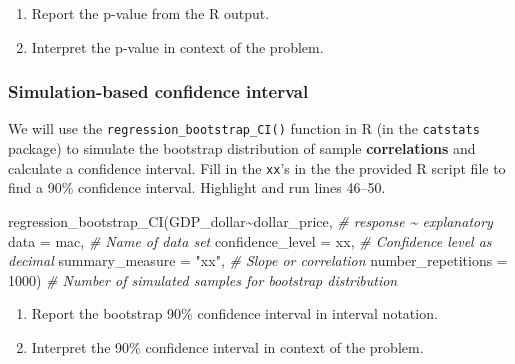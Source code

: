 \documentclass[
]{report}
\newenvironment{Shaded}{\begin{snugshade}}{\end{snugshade}}
\newcommand{\AttributeTok}[1]{\textcolor[rgb]{0.77,0.63,0.00}{#1}}
\newcommand{\CommentTok}[1]{\textcolor[rgb]{0.56,0.35,0.01}{\textit{#1}}}
\newcommand{\DecValTok}[1]{\textcolor[rgb]{0.00,0.00,0.81}{#1}}
\newcommand{\FunctionTok}[1]{\textcolor[rgb]{0.00,0.00,0.00}{#1}}
\newcommand{\NormalTok}[1]{#1}
\newcommand{\SpecialCharTok}[1]{\textcolor[rgb]{0.00,0.00,0.00}{#1}}
\newcommand{\StringTok}[1]{\textcolor[rgb]{0.31,0.60,0.02}{#1}}
\begin{document}
\begin{enumerate}
\def\labelenumi{\arabic{enumi}.}
\setcounter{enumi}{7}
\item
  Report the p-value from the R output.
  \vspace{0.3in}
\item
  Interpret the p-value in context of the problem.
  \vspace{0.8in}
\end{enumerate}

\hypertarget{simulation-based-confidence-interval-1}{%
\subsubsection*{Simulation-based confidence interval}\label{simulation-based-confidence-interval-1}}

We will use the \texttt{regression\_bootstrap\_CI()} function in R (in the \texttt{catstats} package) to simulate the bootstrap distribution of sample \textbf{correlations} and calculate a confidence interval. Fill in the \texttt{xx}'s in the the provided R script file to find a 90\% confidence interval. Highlight and run lines 46--50.

\begin{Shaded}
\begin{Highlighting}[]
\FunctionTok{regression\_bootstrap\_CI}\NormalTok{(GDP\_dollar}\SpecialCharTok{\textasciitilde{}}\NormalTok{dollar\_price, }\CommentTok{\# response \textasciitilde{} explanatory}
   \AttributeTok{data =}\NormalTok{ mac, }\CommentTok{\# Name of data set}
   \AttributeTok{confidence\_level =}\NormalTok{ xx, }\CommentTok{\# Confidence level as decimal}
   \AttributeTok{summary\_measure =} \StringTok{"xx"}\NormalTok{, }\CommentTok{\# Slope or correlation}
   \AttributeTok{number\_repetitions =} \DecValTok{1000}\NormalTok{) }\CommentTok{\# Number of simulated samples for bootstrap distribution}
\end{Highlighting}
\end{Shaded}

\begin{enumerate}
\def\labelenumi{\arabic{enumi}.}
\setcounter{enumi}{9}
\item
  Report the bootstrap 90\% confidence interval in interval notation.\\
  \vspace{0.5in}
\item
  Interpret the 90\% confidence interval in context of the problem.
  \vspace{0.8in}
\end{enumerate}
\end{document}
